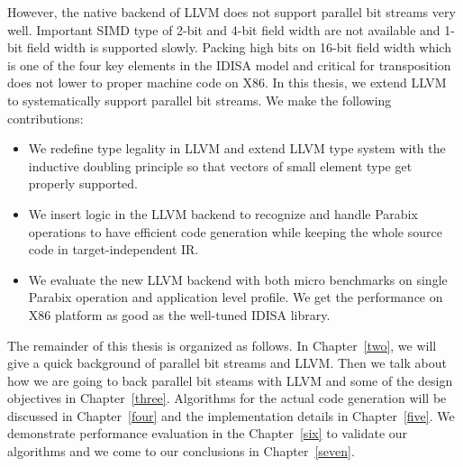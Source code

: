 However, the native backend of LLVM does not support parallel bit streams very well. Important SIMD type of 2-bit and 4-bit field width are not available and 1-bit field width is supported slowly. Packing high bits on 16-bit field width which is one of the four key elements in the IDISA model and critical for transposition does not lower to proper machine code on X86. In this thesis, we extend LLVM to systematically support parallel bit streams. We make the following contributions:

\begin{itemize}
  \item We redefine type legality in LLVM and extend LLVM type system with the inductive doubling principle so that vectors of small element type get properly supported.
  \item We insert logic in the LLVM backend to recognize and handle Parabix operations to have efficient code generation while keeping the whole source code in target-independent IR.
  \item We evaluate the new LLVM backend with both micro benchmarks on single Parabix operation and application level profile. We get the performance on X86 platform as good as the well-tuned IDISA library.
\end{itemize}

The remainder of this thesis is organized as follows. In Chapter~\ref{two}, we will give a quick background of parallel bit streams and LLVM\@. Then we talk about how we are going to back parallel bit steams with LLVM and some of the design objectives in Chapter~\ref{three}. Algorithms for the actual code generation will be discussed in Chapter~\ref{four} and the implementation details in Chapter~\ref{five}. We demonstrate performance evaluation in the Chapter~\ref{six} to validate our algorithms and we come to our conclusions in Chapter~\ref{seven}.

